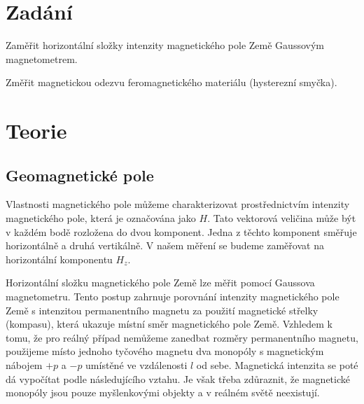 \documentclass[a4paper,11pt]{article}
\begin{document}
\vskip1cm
\begin{minipage}[t]{1\textwidth}
\section{Zadání}
    Zaměřit horizontální složky intenzity magnetického pole Země Gaussovým magnetometrem.
    \par Změřit magnetickou odezvu feromagnetického materiálu (hysterezní smyčka).
\end{minipage}
    \par
    \vspace{10px}
    \begin{minipage}[t]{0.5\textwidth} 
    \section{Teorie}
        \subsection{Geomagnetické pole}
            Vlastnosti magnetického pole můžeme charakterizovat prostřednictvím intenzity magnetického pole, která je označována jako $H$. Tato vektorová veličina může být v každém bodě rozložena do dvou komponent. Jedna z těchto komponent směřuje horizontálně a druhá vertikálně. V našem měření se budeme zaměřovat na horizontální komponentu $H_z$.
            \par Horizontální složku magnetického pole Země lze měřit pomocí Gaussova magnetometru. Tento postup zahrnuje porovnání intenzity magnetického pole Země s intenzitou permanentního magnetu za použití magnetické střelky (kompasu), která ukazuje místní směr magnetického pole Země. Vzhledem k tomu, že pro reálný případ nemůžeme zanedbat rozměry permanentního magnetu, použijeme místo jednoho tyčového magnetu dva monopóly s magnetickým nábojem $+p$ a $-p$ umístěné ve vzdálenosti $l$ od sebe. Magnetická intenzita se poté dá vypočítat podle následujícího vztahu. Je však třeba zdůraznit, že magnetické monopóly jsou pouze myšlenkovými objekty a v reálném světě neexistují.
    \end{minipage}
    \hspace{10pt}
\end{document}
